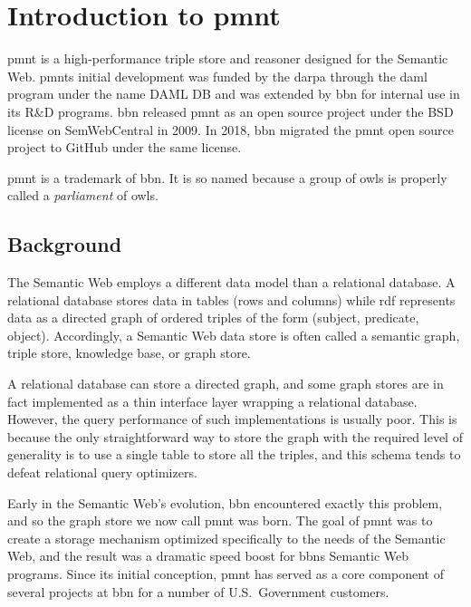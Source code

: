 
\chapter{Introduction to \acl{pmnt}}

\acl{pmnt} is a high-performance triple store and reasoner designed for the Semantic Web.  \acp{pmnt} initial development was funded by the \ac{darpa} through the \ac{daml} program under the name DAML DB and was extended by \ac{bbn} for internal use in its R\&D programs.  \ac{bbn} released \ac{pmnt} as an open source project under the BSD license on SemWebCentral in 2009.  In 2018, \ac{bbn} migrated the \ac{pmnt} open source project to GitHub under the same license.

\acl{pmnt} is a trademark of \acl{bbn}.  It is so named because a group of owls is properly called a \emph{parliament} of owls.

\section{Background}

The Semantic Web employs a different data model than a relational database.  A relational database stores data in tables (rows and columns) while \ac{rdf} represents data as a directed graph of ordered triples of the form (subject, predicate, object).  Accordingly, a Semantic Web data store is often called a semantic graph, triple store, knowledge base, or graph store.

A relational database can store a directed graph, and some graph stores are in fact implemented as a thin interface layer wrapping a relational database.  However, the query performance of such implementations is usually poor.  This is because the only straightforward way to store the graph with the required level of generality is to use a single table to store all the triples, and this schema tends to defeat relational query optimizers.

Early in the Semantic Web's evolution, \ac{bbn} encountered exactly this problem, and so the graph store we now call \ac{pmnt} was born.  The goal of \ac{pmnt} was to create a storage mechanism optimized specifically to the needs of the Semantic Web, and the result was a dramatic speed boost for \acp{bbn} Semantic Web programs.  Since its initial conception, \ac{pmnt} has served as a core component of several projects at \ac{bbn} for a number of U.S.\ Government customers.

